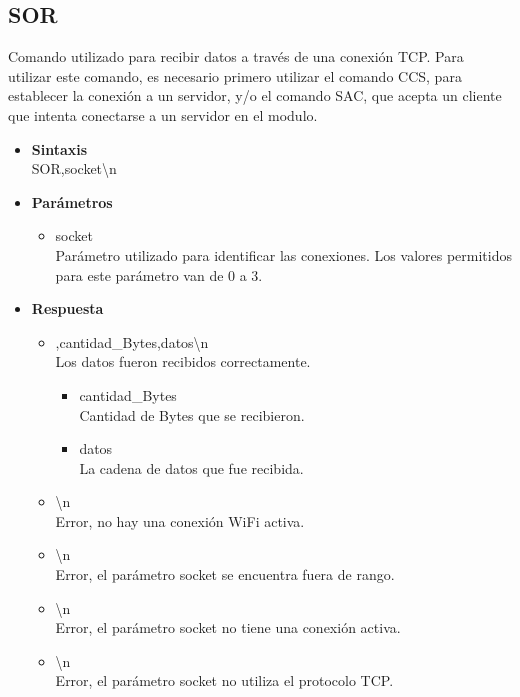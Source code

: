 \documentclass[a4paper,spanish]{article}
\begin{document}
\subsection{SOR}
Comando utilizado para recibir datos a través de una conexión TCP. Para utilizar este comando, es necesario primero utilizar el comando CCS, para establecer la conexión a un servidor, y/o el comando SAC, que acepta un cliente que intenta conectarse a un servidor en el modulo.  
\begin{itemize}
	\item \textbf{Sintaxis}\\
	{\ttfamily SOR,socket\textbackslash n}
	\item \textbf{Parámetros}
	\begin{itemize}
		\item{\ttfamily socket}\\
		Parámetro utilizado para identificar las conexiones. Los valores permitidos para este parámetro van de 0 a 3.
	\end{itemize}
	\item \textbf{Respuesta}
	\begin{itemize}
		\item{,cantidad\_Bytes,datos\textbackslash n} \\
		Los datos fueron recibidos correctamente.
		\begin{itemize}
			\item {\ttfamily cantidad\_Bytes}\\
			Cantidad de Bytes que se recibieron. 
			\item {\ttfamily datos}\\
			La cadena de datos que fue recibida.
		\end{itemize}
		\item{\textbackslash n} \\
		Error, no hay una conexión WiFi activa.
		\item{\textbackslash n} \\
		Error, el parámetro {\ttfamily socket} se encuentra fuera de rango.
		\item{\textbackslash n} \\
		Error, el parámetro {\ttfamily socket} no tiene una conexión activa.
		\item{\textbackslash n} \\
		Error, el parámetro {\ttfamily socket} no utiliza el protocolo TCP.
	\end{itemize}
\end{itemize}
\end{document}
